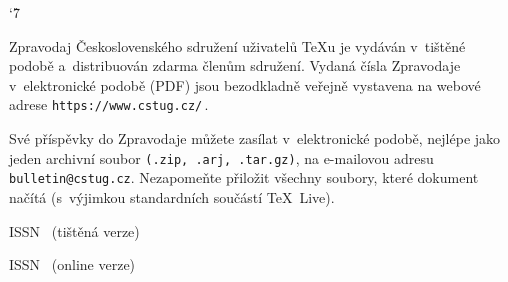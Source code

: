 \documentclass[color]{csbulletin}[2021/03/19] %
\begin{document}
\catcode`\^7 %
\shorthandoff{-} %

%

\Obalka

\begingroup
{}
\renewcommand\textls[2][]{#2}  %
\tableofcontents
\endgroup

\vfill
\begin{small}
\noindent
Zpravodaj Československého sdružení uživatelů \TeX u je vydáván v~tištěné podobě
a~distribuován zdarma členům sdružení. Vydaná čísla Zpravodaje v~elektronické
podobě (PDF) jsou bezodkladně veřejně vystavena na webové adrese
\texttt{https://www.cstug.cz/}\,.

\medskip\noindent
Své příspěvky do Zpravodaje můžete zasílat v~elektronické podobě, nejlépe jako
jeden archivní soubor \texttt{(.zip, .arj, .tar.gz)}, na e-mailovou adresu
\texttt{bulletin@cstug.cz}.
Nezapomeňte přiložit všechny soubory, které dokument načítá (s~výjimkou
standardních součástí \TeX~Live).
\end{small}

\bigskip

\noindent ISSN \ISSN\ (ti\v{s}t\v{e}n\'{a} verze)

\noindent ISSN \XISSN\ (online verze)



\StartPage[1]



\tiraz

\begingroup
{}
\EnglishTOC
\endgroup
\end{document}
